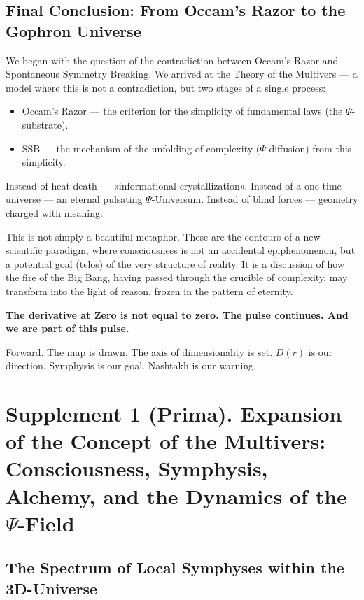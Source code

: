 \documentclass[a4paper,12pt]{article}
\begin{document}
	\subsection{Final Conclusion: From Occam's Razor to the Gophron Universe}
	
	We began with the question of the contradiction between Occam's Razor and Spontaneous Symmetry Breaking. We arrived at the Theory of the Multivers — a model where this is not a contradiction, but two stages of a single process:
	\begin{itemize}
		\item Occam's Razor — the criterion for the simplicity of fundamental laws (the $\Psi$-substrate).
		\item SSB — the mechanism of the unfolding of complexity ($\Psi$-diffusion) from this simplicity.
	\end{itemize}
	
	Instead of heat death — «informational crystallization».
	Instead of a one-time universe — an eternal pulsating $\Psi$-Universum.
	Instead of blind forces — geometry charged with meaning.
	
	This is not simply a beautiful metaphor. These are the contours of a new scientific paradigm, where consciousness is not an accidental epiphenomenon, but a potential goal (telos) of the very structure of reality. It is a discussion of how the fire of the Big Bang, having passed through the crucible of complexity, may transform into the light of reason, frozen in the pattern of eternity.
	
	\textbf{The derivative at Zero is not equal to zero. The pulse continues. And we are part of this pulse.}
	
	Forward. The map is drawn. The axis of dimensionality is set. $D(r)$ is our direction. Symphysis is our goal. Nashtakh is our warning.
	
	\newpage
	\setcounter{section}{0}
	\renewcommand{\thesection}{S.\arabic{section}}
	\renewcommand{\thesubsection}{\arabic{section}.\arabic{subsection}}
	
	\section{Supplement 1 (Prima). Expansion of the Concept of the Multivers: Consciousness, Symphysis, Alchemy, and the Dynamics of the $\Psi$-Field}
	
	\subsection{The Spectrum of Local Symphyses within the 3D-Universe}
	
\end{document}

